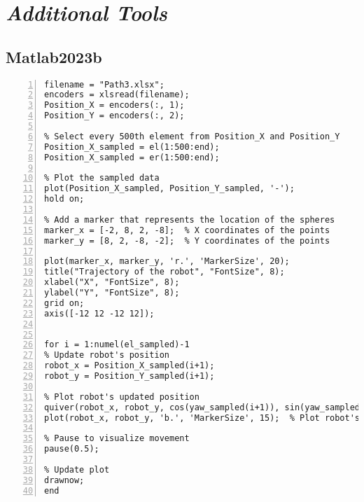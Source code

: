 \documentclass[]{article}
\begin{document}
\newpage

	
	\section{\textit{Additional Tools}}
	\subsection{Matlab2023b}
	
\begin{lstlisting}[frame=single, numbers=left, style=Matlab-Pyglike]
filename = "Path3.xlsx";
encoders = xlsread(filename);
Position_X = encoders(:, 1);
Position_Y = encoders(:, 2);

% Select every 500th element from Position_X and Position_Y
Position_X_sampled = el(1:500:end);
Position_X_sampled = er(1:500:end);

% Plot the sampled data
plot(Position_X_sampled, Position_Y_sampled, '-');
hold on;

% Add a marker that represents the location of the spheres 
marker_x = [-2, 8, 2, -8];  % X coordinates of the points
marker_y = [8, 2, -8, -2];  % Y coordinates of the points

plot(marker_x, marker_y, 'r.', 'MarkerSize', 20); 
title("Trajectory of the robot", "FontSize", 8);
xlabel("X", "FontSize", 8);
ylabel("Y", "FontSize", 8);
grid on;
axis([-12 12 -12 12]);


for i = 1:numel(el_sampled)-1
% Update robot's position
robot_x = Position_X_sampled(i+1);
robot_y = Position_Y_sampled(i+1);

% Plot robot's updated position
quiver(robot_x, robot_y, cos(yaw_sampled(i+1)), sin(yaw_sampled(i+1)), 'Color', 'b','ShowArrowHead','on','LineWidth',1); % Plot heading
plot(robot_x, robot_y, 'b.', 'MarkerSize', 15);  % Plot robot's position

% Pause to visualize movement
pause(0.5); 

% Update plot
drawnow;
end

\end{lstlisting}
	
\end{document}
